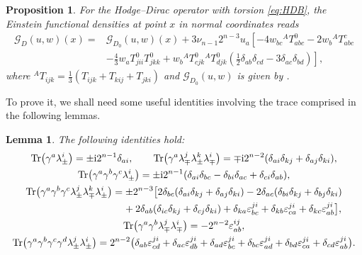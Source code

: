 \documentclass[pdftex]{sigma}
\numberwithin{equation}{section}
\newtheorem{Lemma}[Theorem]{Lemma}
\newtheorem{Proposition}[Theorem]{Proposition}
\theoremstyle{definition}
\def\Tr{\mathrm{Tr}}
\begin{document}
\begin{Proposition}\label{prop:Ein_HD}
For the Hodge--Dirac operator with torsion \eqref{eq:HDB}, the Einstein functional densities at point $x$ in normal coordinates reads
\begin{align*}%
\mathscr{G}_D(u,w)(x)={}&\mathscr{G}_{D_0}(u,w)(x)
			+ 3\nu_{n-1}2^{n-3} u_a\left[-4w_{bc}{}^AT^{0}_{abc}-2w_b {}^AT^{c}_{abc}\right. \\
 &\left.-\frac{4}{3}w_a T^0_{jii}T^{0}_{jkk} +w_b {}^AT^{0}_{cjk} {}^AT^{0}_{djk}\left(\frac{1}{2}\delta_{ab}\delta_{cd}-3\delta_{ac}\delta_{bd}\right) \right],
		\end{align*}
where ${}^AT_{ijk}=\frac{1}{3}(T_{ijk}+T_{kij}+T_{jki})$ and $\mathscr{G}_{D_0}(u,w)$ is given by {\rm\cite[\emph{Proposition}~3.3]{dabrowski2024}}.
\end{Proposition}
To prove it, we shall need some useful identities involving the trace comprised in the following lemmas.
\begin{Lemma}
	The following identities hold:
	\begin{gather*}
				 \Tr\bigl(\gamma^a \lambda^i_{\pm}\bigr)=\pm{\rm i} 2^{n-1}\delta_{ai}, \qquad
			 \Tr\bigl(\gamma^a \lambda^j_{\mp}\lambda^k_{\pm}\lambda^i_{\mp}\bigr)=\mp{\rm i} 2^{n-2}(\delta_{ai}\delta_{kj}+\delta_{aj}\delta_{ki}), \\
			 \Tr\bigl(\gamma^a\gamma^b \gamma^c \lambda^i_{\pm}\bigr)=\pm{\rm i} 2^{n-1}(\delta_{ai}\delta_{bc}-\delta_{bi}\delta_{ac}+\delta_{ci}\delta_{ab}), \\
				\Tr\bigl(\gamma^a\gamma^b\gamma^c \lambda^j_{\pm}\lambda^k_{\mp}\lambda^i_{\pm}\bigr)=\pm 2^{n-3}\bigl[2\delta_{bc}(\delta_{ai}\delta_{kj}+\delta_{aj}\delta_{ki})-2\delta_{ac}(\delta_{bi}\delta_{kj}+\delta_{bj}\delta_{ki})\\
		\phantom{\Tr\bigl(\gamma^a\gamma^b\gamma^c \lambda^j_{\pm}\lambda^k_{\mp}\lambda^i_{\pm}\bigr)=}{}
+2\delta_{ab}(\delta_{ic}\delta_{kj}+\delta_{cj}\delta_{ki})+\delta_{ka}\varepsilon^{ji}_{bc}+\delta_{kb}\varepsilon^{ji}_{ca}+\delta_{kc}\varepsilon^{ji}_{ab}\bigr],
 \\
			 \Tr\bigl(\gamma^a\gamma^b \lambda^j_{\mp}\lambda^i_{\mp}\bigr)=-2^{n-2}\varepsilon^{ij}_{ab}, \\
			 \Tr\bigl(\gamma^a\gamma^b\gamma^c\gamma^d \lambda^j_{\pm}\lambda^i_{\pm}\bigr)=2^{n-2}\bigl(\delta_{ab}\varepsilon^{ji}_{cd}+\delta_{ac}\varepsilon^{ji}_{db}+\delta_{ad}\varepsilon^{ji}_{bc}
+\delta_{bc}\varepsilon^{ji}_{ad}+\delta_{bd}\varepsilon^{ji}_{ca}+\delta_{cd}\varepsilon^{ji}_{ab}\bigr).	
	\end{gather*}
\end{Lemma}
\end{document}
